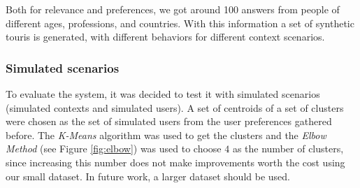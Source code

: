     Both for relevance and preferences, we got around 100 answers from people of different ages, professions, and countries.  With this information a set of synthetic touris is generated, with different behaviors for different context scenarios.
    





\subsubsection{Simulated scenarios}
To evaluate the system, it was decided to test it with simulated scenarios (simulated contexts and simulated users). A set of centroids of a set of clusters were chosen as the set of simulated users from the user preferences gathered before. The \textit{K-Means} algorithm was used to get the clusters and the \textit{Elbow Method} (see Figure \ref{fig:elbow}) was used to choose $4$ as the number of clusters, since increasing this number does not make improvements worth the cost using our small dataset. In future work, a larger dataset should be used.

